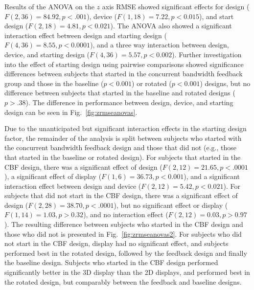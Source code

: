 Results of the ANOVA on the $z$ axis RMSE showed significant effects for design ($F(2, 36)=84.92, p<.001$), device ($F(1, 18)=7.22, p<0.015$), and start design ($F(2, 18)=4.81, p<0.021$).
The ANOVA also showed a significant interaction effect between design and starting design ($F(4, 36)=8.55, p<0.0001$), and a three way interaction between design, device, and starting design ($F(4, 36)=5.57, p<0.002$).
Further investigation into the effect of starting design using pairwise comparisons showed significance differences between subjects that started in the concurrent bandwidth feedback group and those in the baseline ($p<0.001$) or rotated ($p<0.001$) designs, but no difference between subjects that started in the baseline and rotated designs ($p>.38$).
The difference in performance between design, device, and starting design can be seen in Fig.~\ref{fig:zrmseanovas}.

Due to the unanticipated but significant interaction effects in the starting design factor, the remainder of the analysis is split between subjects who started with the concurrent bandwidth feedback design and those that did not (e.g., those that started in the baseline or rotated design).
For subjects that started in the CBF design, there was a significant effect of design ($F(2, 12)=21.65, p<.0001$), a significant effect of display ($F(1, 6)=36.73, p<0.001$), and a significant interaction effect between design and device ($F(2, 12)=5.42, p<0.021$).
For subjects that did not start in the CBF design, there was a significant effect of design ($F(2, 28)=38.70, p<.0001$), but no significant effect or display ($F(1, 14)=1.03, p>0.32$), and no interaction effect ($F(2, 12)=0.03, p>0.97$).
The resulting difference between subjects who started in the CBF design and those who did not is presented in Fig.~\ref{fig:zrmseanovas2}.
For subjects who did not start in the CBF design, display had no significant effect, and subjects performed best in the rotated design, followed by the feedback design and finally the baseline design.
Subjects who started in the CBF design performed significantly better in the 3D display than the 2D displays, and performed best in the rotated design, but comparably between the feedback and baseline designs.

